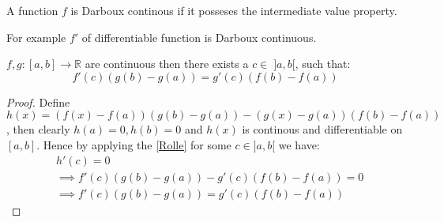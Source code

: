 \begin{definition}
    A function \(f\) is Darboux continous if it posseses the intermediate value property.
\end{definition}
For example \(f'\) of differentiable function is Darboux continuous.
\begin{theorem}
    \(f,g : [a,b] \to \mathbb{R}\) are continuous then there exists a \(c \in \; ]a,b[\), such that:
    \begin{equation*}
        f'(c)(g(b) - g(a)) = g'(c)(f(b) - f(a))
    \end{equation*}
\end{theorem}
\begin{proof}
    Define \(h(x) = (f(x) - f(a))(g(b) - g(a)) -  (g(x) - g(a))(f(b) - f(a))\), then clearly \(h(a) =0, h(b) =0\) and \(h(x)\) is continous and differentiable on \([a,b]\). Hence by applying the \cref{Rolle} for some \(c \in ]a,b[\) we have:
    \begin{align*}
         & h'(c)  = 0                                            \\
         & \implies f'(c)(g(b) - g(a)) -  g'(c)(f(b) - f(a)) = 0 \\
         & \implies  f'(c)(g(b) - g(a)) =  g'(c)(f(b) - f(a))
    \end{align*}
\end{proof}

